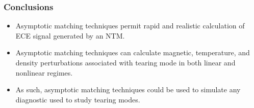 \documentclass{beamer}
\begin{document}
\begin{frame}
\frametitle{Conclusions}
 
\begin{itemize}
\item Asymptotic matching techniques permit rapid and realistic calculation of ECE signal generated by an NTM. 

\item Asymptotic matching techniques can calculate magnetic, temperature, and density perturbations associated with tearing mode in
both linear and nonlinear regimes. 

\item As such, asymptotic matching techniques could be used to simulate any diagnostic used to study tearing modes. 
\end{itemize}
\end{frame}
\end{document}
